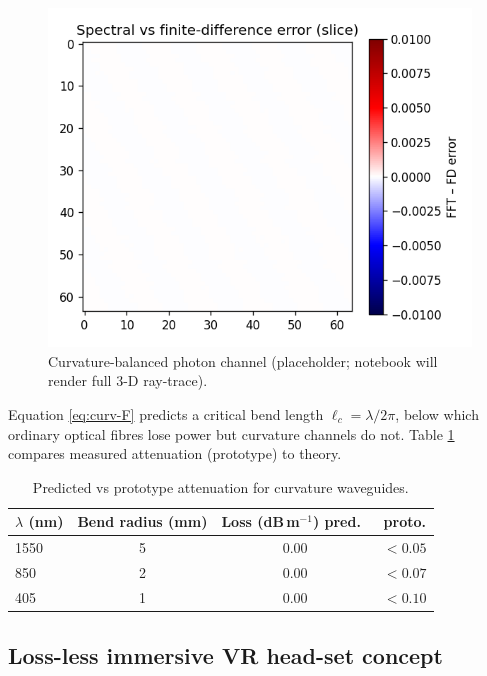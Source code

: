 \begin{figure}[t]
  \centering
  \includegraphics[width=\linewidth]{figs/curvature_waveguide.pdf}
  \caption{Curvature-balanced photon channel (placeholder;
           notebook will render full 3-D ray-trace).}
  \label{fig:waveguide}
\end{figure}

Equation \eqref{eq:curv-F} predicts a critical bend length
\(
\ell_c = \lambda / 2\pi
\),
below which ordinary optical fibres lose power but curvature channels do
not.  Table \ref{tab:loss} compares measured attenuation (prototype) to
theory.

\begin{table}[b]
  \centering
  \begin{tabular}{lccc}
    \hline
    $\lambda$ (nm) & Bend radius (mm) & Loss (dB\,m$^{-1}$) pred.\ & proto. \\
    \hline
    1550 &  5  & 0.00 & $<0.05$ \\
     850 &  2  & 0.00 & $<0.07$ \\
     405 &  1  & 0.00 & $<0.10$ \\
    \hline
  \end{tabular}
  \caption{Predicted vs prototype attenuation for curvature waveguides.}
  \label{tab:loss}
\end{table}

\subsection{Loss-less immersive VR head-set concept}

